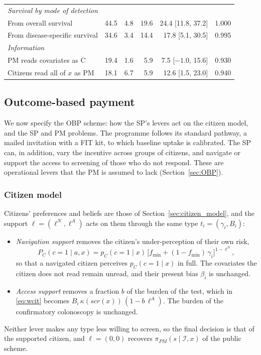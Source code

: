 \documentclass[12pt]{article}
\begin{document}
\begin{table}[h!]
\begin{tabular}{l c r r r c}
\midrule
\multicolumn{6}{l}{\emph{Survival by mode of detection}} \\
From overall survival              & 44.5 & 4.8 & 19.6 & 24.4 [11.8, 37.2]    & 1.000 \\
From disease-specific survival     & 34.6 & 3.4 & 14.4 & 17.8 [5.1, 30.5]     & 0.995 \\
\midrule
\multicolumn{6}{l}{\emph{Information}} \\
PM reads covariates as C           & 19.4 & 1.6 &  5.9 &  7.5 [$-1.0$, 15.6]  & 0.930 \\
Citizens read all of $x$ as PM     & 18.1 & 6.7 &  5.9 & 12.6 [1.5, 23.0]     & 0.940 \\
\bottomrule
\end{tabular}
\end{table}





\subsection{Outcome-based payment} \label{sec:obp_modelling}
We now specify the OBP scheme: how the SP's levers act on the citizen model, and the SP and PM problems. The programme follows its standard pathway, a mailed invitation with a FIT kit, to which baseline uptake is calibrated. The SP can, in addition, vary the incentive across groups of citizens, and navigate or support the access to screening of those who do not respond. These are operational levers that the PM is assumed to lack (Section~\ref{sec:OBP}).

\subsubsection{Citizen model}\label{sec:obp_c}
Citizens' preferences and beliefs are those of Section~\ref{sec:citizen_model}, and the support $\ell = (\ell^N, \ell^A)$ acts on them through the same type $t_i = (\gamma_i, B_i)$:
\begin{itemize}
    \item \emph{Navigation support} removes the citizen's under-perception of their own risk,
    \begin{equation*}
        P_C(c=1 \mid a, x) = p_C(c=1 \mid x)\,
        \big[f_{\min} + (1 - f_{\min})\, \gamma_i\big]^{1 - \ell^N},
    \end{equation*}
    so that a navigated citizen perceives $p_C(c = 1 \mid x)$ in full. The covariates the citizen does not read remain unread, and their present bias $\beta_i$ is unchanged. 
    \item \emph{Access support} removes a fraction $b$ of the burden of the test, which in \eqref{eq:wcit} becomes $B_i\, \kappa(scr(x))\, (1 - b\, \ell^A)$. The burden of the confirmatory colonoscopy is unchanged.
\end{itemize}
Neither lever makes any type less willing to screen, so the final decision is that of the supported citizen, and $\ell = (0,0)$ recovers $\pi_{PM}(s \mid \mathcal{I}, x)$ of the public scheme.
\end{document}
